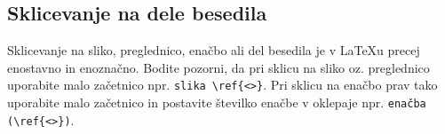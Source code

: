 \subsection{Sklicevanje na dele besedila}\label{sec:sklici}

Sklicevanje na sliko, preglednico, enačbo ali del besedila je v \LaTeX u precej enostavno in enoznačno. Bodite pozorni, da pri sklicu na sliko oz. preglednico uporabite malo začetnico npr. \verb|slika \ref{<>}|. Pri sklicu na enačbo prav tako uporabite malo začetnico in postavite številko enačbe v oklepaje npr. \verb|enačba (\ref{<>})|.








